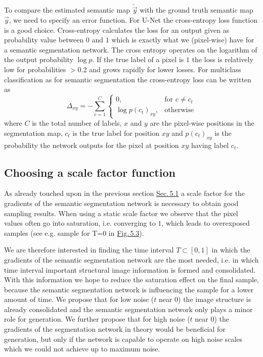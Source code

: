 To compare the estimated semantic map $\tilde{\vec{y}}$ with the ground truth semantic map $\vec{y}$, we need to specify an error function. For U-Net the cross-entropy loss function is a good choice. Cross-entropy calculates the loss for an output given as probability value between $0$ and $1$ which is exactly what we (pixel-wise) have for a semantic segmentation network. The cross entropy operates on the logarithm of the output probability $\log p$. If the true label of a pixel is $1$ the loss is relatively low for probabilities $>0.2$ and grows rapidly for lower losses. For multiclass classification as for semantic segmentation the cross-entropy loss can be written as
%
\begin{equation}
    \Delta_{xy}=-\sum_{c=1}^C 
    \begin{cases}
        0, &\text{for } c\neq c_t\\
        \log p(c_t)_{xy}, &\text{otherwise}
    \end{cases}
\end{equation}
%
where $C$ is the total number of labels, $x$ and $y$ are the pixel-wise positions in the segmentation map, $c_t$ is the true label for position $xy$ and $p(c_t)_{xy}$ is the probability the network outputs for the pixel at position $xy$ having label $c_t$.
%
\subsection{Choosing a scale factor function}
As already touched upon in the previous section \hyperref[sec:5.1]{Sec.\,5.1} a scale factor for the gradients of the semantic segmentation network is necessary to obtain good sampling results. When using a static scale factor we observe that the pixel values often go into saturation, i.e. converging to $1$, which leads to overexposed samples (see e.g. sample for T=0 in \hyperref[fig:5.3]{Fig.\,5.3}). 

We are therefore interested in finding the time interval $T\subset[0,1]$ in which the gradients of the semantic segmentation network are the most needed, i.e. in which time interval important structural image information is formed and consolidated. With this information we hope to reduce the saturation effect on the final sample, because the semantic segmentation network is influencing the sample for a lower amount of time. We propose that for low noise ($t$ near $0$) the image structure is already consolidated and the semantic segmentation network only plays a minor role for generation. We further propose that for high noise ($t$ near $0$) the gradients of the segmentation network in theory would be beneficial for generation, but only if the network is capable to operate on high noise scales which we could not achieve up to maximum noise.

